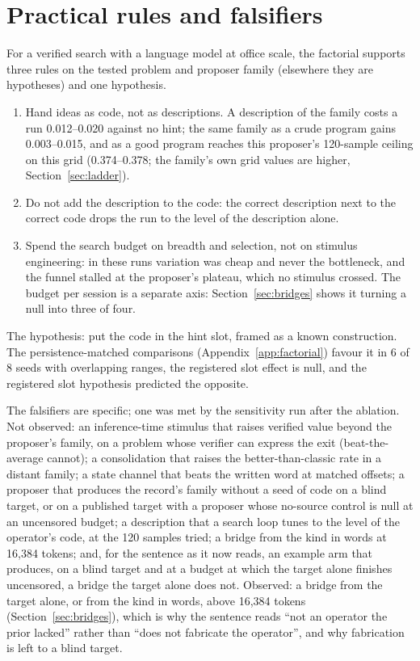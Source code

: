 \documentclass[11pt]{article}
\begin{document}
\section{Practical rules and falsifiers}
\label{sec:rules}

For a verified search with a language model at office scale, the factorial
supports three rules on the tested problem and proposer family (elsewhere
they are hypotheses) and one hypothesis.
\begin{enumerate}
\item Hand ideas as code, not as descriptions. A description of the
family costs a run 0.012--0.020 against no hint; the same family as a crude
program gains 0.003--0.015, and as a good program reaches this proposer's
120-sample ceiling on this grid (0.374--0.378; the family's own grid values
are higher, Section~\ref{sec:ladder}).
\item Do not add the description to the code: the correct description next
to the correct code drops the run to the level of the description alone.
\item Spend the search budget on breadth and selection, not on stimulus
engineering: in these runs variation was cheap and never the bottleneck,
and the funnel stalled at the proposer's plateau, which no stimulus
crossed. The budget per session is a separate axis:
Section~\ref{sec:bridges} shows it turning a null into three of four.
\end{enumerate}
The hypothesis: put the code in the hint slot, framed as a known
construction. The persistence-matched comparisons
(Appendix~\ref{app:factorial}) favour it in 6 of 8 seeds with overlapping
ranges, the registered slot effect is null, and the registered slot
hypothesis predicted the opposite.

The falsifiers are specific; one was met by the sensitivity run after the
ablation. Not observed: an inference-time stimulus that raises verified
value beyond the proposer's family, on a problem whose verifier can express
the exit (beat-the-average cannot); a consolidation that raises the
better-than-classic rate in a distant family; a state channel that beats
the written word at matched offsets; a proposer that produces the record's
family without a seed of code on a blind target, or on a published target
with a proposer whose no-source control is null at an uncensored budget; a
description that a search loop tunes to the level of the operator's code,
at the 120 samples tried; a bridge from the kind in words at 16{,}384
tokens; and, for the sentence as it now reads, an example arm that
produces, on a blind target and at a budget at which the target alone
finishes uncensored, a bridge the target alone does not. Observed: a
bridge from the target alone, or from the kind in words, above 16{,}384
tokens (Section~\ref{sec:bridges}), which is why the sentence reads
``not an operator the prior lacked'' rather than ``does not fabricate the
operator'', and why fabrication is left to a blind target.
\end{document}
